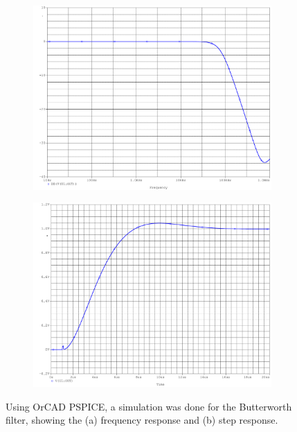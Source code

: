 \documentclass{report}
\begin{document}
\vspace{-1em}
\begin{figure}[H]
	\centering
	\begin{subfigure}{0.4\textwidth}
		\centering
		\includegraphics[width=\linewidth]{exp2_orcad_bode}
		\caption{}
	\end{subfigure}
	\begin{subfigure}{0.4\textwidth}
		\centering
		\includegraphics[width=\linewidth]{exp2_orcad_step}
		\caption{}
	\end{subfigure}
	\caption{Using OrCAD PSPICE, a simulation was done for the Butterworth filter, showing the (a) frequency response and (b) step response.}
	\label{fig:exp2_orcad}	
\end{figure}
\end{document}
